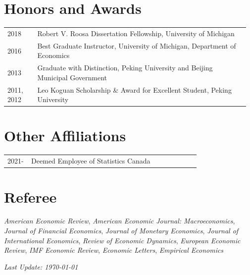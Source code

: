 \documentclass[11pt]{article}
\begin{document}
\section{Honors and Awards}


\begin{tabular}{p{0.12\linewidth} p{0.85\linewidth}}
	2018 & Robert V. Roosa Dissertation Fellowship, University of Michigan\\
	2016 & Best Graduate Instructor, University of Michigan, Department of Economics\\
	2013 & Graduate with Distinction, Peking University and Beijing Municipal Government\\
	2011, 2012 & Leo Koguan Scholarship \& Award for Excellent Student, Peking University\\
\end{tabular}

\section{Other Affiliations}
\begin{tabular}{p{0.12\linewidth} p{0.85\linewidth}}
	2021- & Deemed Employee of Statistics Canada\\
\end{tabular}
\section{Referee}
\textit{American Economic Review}, \textit{American Economic Journal: Macroeconomics}, \textit{Journal of Financial Economics}, \textit{Journal of Monetary Economics}, \textit{Journal of International Economics}, \textit{Review of Economic Dynamics}, \textit{European Economic Review}, \textit{IMF Economic Review}, \textit{Economic Letters}, \textit{Empirical Economics}








\vfill\hfill \textit{Last Update: \monthyeardate \today{}}
\end{document}
